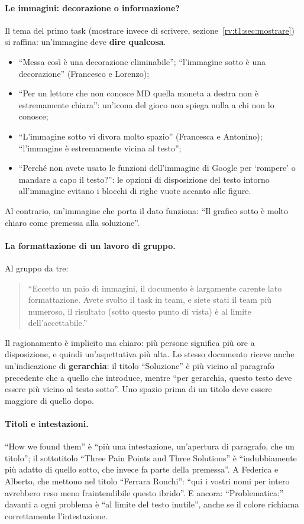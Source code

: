 \paragraph{Le immagini: decorazione o informazione?} Il tema del primo task
(mostrare invece di scrivere, sezione~\ref{rv:t1:sec:mostrare}) si raffina:
un'immagine deve \textbf{dire qualcosa}.
\begin{itemize}
  \item ``Messa così è una decorazione eliminabile''; ``l'immagine sotto è
        una decorazione'' (Francesco e Lorenzo);
  \item ``Per un lettore che non conosce MD quella moneta a destra non è
        estremamente chiara'': un'icona del gioco non spiega nulla a chi non
        lo conosce;
  \item ``L'immagine sotto vi divora molto spazio'' (Francesca e Antonino);
        ``l'immagine è estremamente vicina al testo'';
  \item ``Perché non avete usato le funzioni dell'immagine di Google per
        `rompere' o mandare a capo il testo?'': le opzioni di disposizione
        del testo intorno all'immagine evitano i blocchi di righe vuote
        accanto alle figure.
\end{itemize}
Al contrario, un'immagine che porta il dato funziona: ``Il grafico sotto è
molto chiaro come premessa alla soluzione''.

\paragraph{La formattazione di un lavoro di gruppo.} Al gruppo da tre:
\begin{quote}
  ``Eccetto un paio di immagini, il documento è largamente carente lato
  formattazione. Avete svolto il task in team, e siete stati il team più
  numeroso, il risultato (sotto questo punto di vista) è al limite
  dell'accettabile.''
\end{quote}
Il ragionamento è implicito ma chiaro: più persone significa più ore a
disposizione, e quindi un'aspettativa più alta. Lo stesso documento riceve
anche un'indicazione di \textbf{gerarchia}: il titolo ``Soluzione'' è più
vicino al paragrafo precedente che a quello che introduce, mentre ``per
gerarchia, questo testo deve essere più vicino al testo sotto''. Uno spazio
prima di un titolo deve essere maggiore di quello dopo.

\paragraph{Titoli e intestazioni.} ``How we found them'' è ``più una
intestazione, un'apertura di paragrafo, che un titolo''; il sottotitolo
``Three Pain Points and Three Solutions'' è ``indubbiamente più adatto di
quello sotto, che invece fa parte della premessa''. A Federica e Alberto, che
mettono nel titolo ``Ferrara Ronchi'': ``qui i vostri nomi per intero avrebbero
reso meno fraintendibile questo ibrido''. E ancora: ``Problematica:'' davanti
a ogni problema è ``al limite del testo inutile'', anche se il colore
richiama correttamente l'intestazione.

